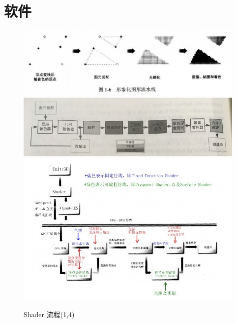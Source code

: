 \documentclass[UTF8,a4paper,12pt]{ctexbook}
\begin{document}
	\section{软件}   
		\begin{figure}[H]
			\centering
			\includegraphics[scale=0.59]{ShaderPro}
			\includegraphics[scale=0.69]{ShaderProc}
			\includegraphics[scale=0.59]{ShaderPro2}
			\caption{Shader 流程(1,4)}
		\end{figure}
	
\end{document}
